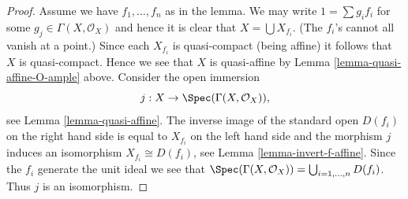 \begin{proof}
Assume we have $f_1, \ldots, f_n$ as in the lemma.
We may write $1 = \sum g_i f_i$ for some $g_j \in \Gamma(X, \mathcal{O}_X)$
and hence it is clear that $X = \bigcup X_{f_i}$. (The $f_i$'s cannot
all vanish at a point.) Since each $X_{f_i}$
is quasi-compact (being affine) it follows that $X$ is quasi-compact.
Hence we see that $X$ is quasi-affine by
Lemma \ref{lemma-quasi-affine-O-ample} above.
Consider the open immersion
$$
j : X \to \Spec(\Gamma(X, \mathcal{O}_X)),
$$
see Lemma \ref{lemma-quasi-affine}. The inverse image of the standard open
$D(f_i)$ on the right hand side is equal to $X_{f_i}$ on the
left hand side and the morphism $j$ induces an isomorphism
$X_{f_i} \cong D(f_i)$, see
Lemma \ref{lemma-invert-f-affine}. Since the $f_i$ generate the unit ideal
we see that $\Spec(\Gamma(X, \mathcal{O}_X))
= \bigcup_{i = 1, \ldots, n} D(f_i)$. Thus $j$ is an isomorphism.
\end{proof}








